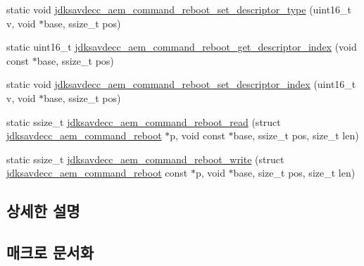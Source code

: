 \begin{DoxyCompactItemize}
\item 
static void \hyperlink{group__command__reboot_gaaa29b5bdf032a6326fc121ddb06ab0bd}{jdksavdecc\+\_\+aem\+\_\+command\+\_\+reboot\+\_\+set\+\_\+descriptor\+\_\+type} (uint16\+\_\+t v, void $\ast$base, ssize\+\_\+t pos)
\item 
static uint16\+\_\+t \hyperlink{group__command__reboot_ga05a4d0c0bcd7bf1c9ffcfad1b9009302}{jdksavdecc\+\_\+aem\+\_\+command\+\_\+reboot\+\_\+get\+\_\+descriptor\+\_\+index} (void const $\ast$base, ssize\+\_\+t pos)
\item 
static void \hyperlink{group__command__reboot_gae8fd6bfa84299e6c5949e87035246a18}{jdksavdecc\+\_\+aem\+\_\+command\+\_\+reboot\+\_\+set\+\_\+descriptor\+\_\+index} (uint16\+\_\+t v, void $\ast$base, ssize\+\_\+t pos)
\item 
static ssize\+\_\+t \hyperlink{group__command__reboot_ga60ace41ee463cb2628cba17612c1b5c1}{jdksavdecc\+\_\+aem\+\_\+command\+\_\+reboot\+\_\+read} (struct \hyperlink{structjdksavdecc__aem__command__reboot}{jdksavdecc\+\_\+aem\+\_\+command\+\_\+reboot} $\ast$p, void const $\ast$base, ssize\+\_\+t pos, size\+\_\+t len)
\item 
static ssize\+\_\+t \hyperlink{group__command__reboot_ga47e876f80dcc650ced15fa1579fece63}{jdksavdecc\+\_\+aem\+\_\+command\+\_\+reboot\+\_\+write} (struct \hyperlink{structjdksavdecc__aem__command__reboot}{jdksavdecc\+\_\+aem\+\_\+command\+\_\+reboot} const $\ast$p, void $\ast$base, size\+\_\+t pos, size\+\_\+t len)
\end{DoxyCompactItemize}


\subsection{상세한 설명}


\subsection{매크로 문서화}
